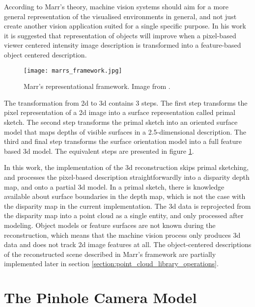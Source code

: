\documentclass[12pt,a4paper,oneside,pdftex]{report}
\begin{document}
{According to Marr's theory, machine vision systems should aim for a more general representation of the visualised environments in general, and not just create another vision application suited for a single specific purpose. In his work it is suggested that representation of objects will improve when a pixel-based viewer centered intensity image description is transformed into a feature-based object centered description.

\begin{figure}[ht]
  \begin{center}
    \texttt{[image: marrs\_framework.jpg]}
    \caption{Marr's representational framework. Image from \citep{Marr82}.}
    \label{fig:marrs_framework}
  \end{center}
\end{figure}

The transformation from 2d to 3d contains 3 steps. The first step transforms the pixel representation of a 2d image into a surface representation called primal sketch. The second step transforms the primal sketch into an oriented surface model that maps depths of visible surfaces in a 2.5-dimensional description. The third and final step transforms the surface orientation model into a full feature based 3d model. The equivalent steps are presented in figure \ref{fig:marrs_framework}.

In this work, the implementation of the 3d reconstruction skips primal sketching, and processes the pixel-based description straightforwardly into a disparity depth map, and onto a partial 3d model. In a primal sketch, there is knowledge available about surface boundaries in the depth map, which is not the case with the disparity map in the current implementation. The 3d data is reprojected from the disparity map into a point cloud as a single entity, and only processed after modeling. Object models or feature surfaces are not known during the reconstruction, which means that the machine vision process only produces 3d data and does not track 2d image features at all. The object-centered descriptions of the reconstructed scene described in Marr's framework are partially implemented later in section \ref{section:point_cloud_library_operations}.

\section{The Pinhole Camera Model}
\label{section:the_pinhole_camera_model}

}
\end{document}
